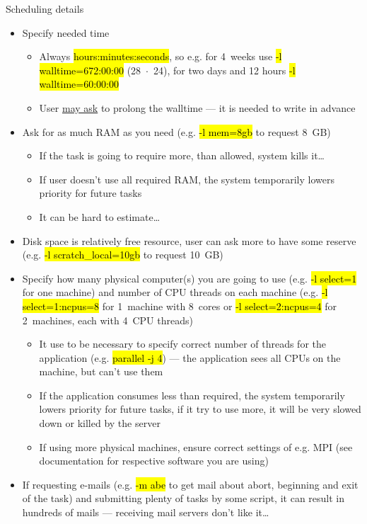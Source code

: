 \documentclass[compress, ucs, xelatex, 11pt, xcolor=svgnames,
  hyperref={
    bookmarks=true,
    unicode=true,
    colorlinks=true,
    pdftitle={Linux, command line and MetaCentrum},
    plainpages=false,
    pdfauthor={Vojtech Zeisek},
    pdfsubject={Course about use of Linux command line, writing shell scripts and using MetaCentrum of CESNET},
    pdfcreator={XeLaTeX},
    pdfkeywords={Linux, GNU, BASH, shell, command line, MetaCentrum},
    linkcolor=DarkRed,
    anchorcolor=DarkBlue,
    citecolor=Indigo,
    filecolor=NavyBlue,
    menucolor=DarkMagenta,
    urlcolor=DarkBlue,
    pdftex},
  url={hyphens, lowtilde} %
  ]{beamer}
\renewcommand{\texttt}[1]{\hl{\ttfamily #1}}
\begin{document}
\begin{frame}[allowframebreaks]{Scheduling details}
  \begin{itemize}
    \item Specify needed time
    \begin{itemize}
      \item Always \texttt{hours:minutes:seconds}, so e.g. for 4~weeks use \texttt{-l walltime=672:00:00} (28~$\cdot$~24), for two days and 12 hours \texttt{-l walltime=60:00:00}
      \item User \href{mailto:meta@cesnet.cz}{may ask} to prolong the walltime --- it is needed to write in advance
    \end{itemize}
    \item Ask for as much RAM as you need (e.g. \texttt{-l mem=8gb} to request 8~GB)
    \begin{itemize}
      \item If the task is going to require more, than allowed, system kills it\ldots
      \item If user doesn't use all required RAM, the system temporarily lowers priority for future tasks
      \item It can be hard to estimate\ldots
    \end{itemize}
    \item Disk space is relatively free resource, user can ask more to have some reserve (e.g. \texttt{-l scratch\_local=10gb} to request 10~GB)
    \item Specify how many physical computer(s) you are going to use (e.g. \texttt{-l select=1} for one machine) and number of CPU threads on each machine (e.g. \texttt{-l select=1:ncpus=8} for 1~machine with 8~cores or \texttt{-l select=2:ncpus=4} for 2~machines, each with 4~CPU threads)
    \begin{itemize}
      \item It use to be necessary to specify correct number of threads for the application (e.g. \texttt{parallel -j 4}) --- the application sees all CPUs on the machine, but can't use them
      \item If the application consumes less than required, the system temporarily lowers priority for future tasks, if it try to use more, it will be very slowed down or killed by the server
      \item If using more physical machines, ensure correct settings of e.g. MPI (see documentation for respective software you are using)
    \end{itemize}
    \item If requesting e-mails (e.g. \texttt{-m abe} to get mail about abort, beginning and exit of the task) and submitting plenty of tasks by some script, it can result in hundreds of mails --- receiving mail servers don't like it\ldots

\end{itemize}
\end{frame}
\end{document}
